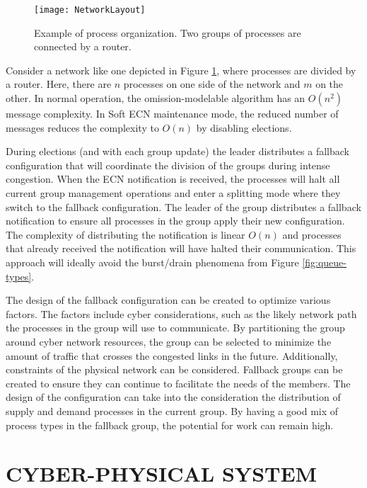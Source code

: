 \begin{figure}
\centering
\texttt{[image: NetworkLayout]}
\caption[Example of process organization.]{Example of process organization. Two groups of processes are connected by a router.} \label{fig:network-layout}
\end{figure}

Consider a network like one depicted in Figure \ref{fig:network-layout}, where processes are divided by a router.
Here, there are $n$ processes on one side of the network and $m$ on the other.
In normal operation, the omission-modelable algorithm has an $O(n^2)$ message complexity.
In Soft \ac{ECN} maintenance mode, the reduced number of messages reduces the complexity to $O(n)$ by disabling elections.

During elections (and with each group update) the leader distributes a fallback configuration that will coordinate the division of the groups during intense congestion.
When the \ac{ECN} notification is received, the processes will halt all current group management operations and enter a splitting mode where they switch to the fallback configuration.
The leader of the group distributes a fallback notification to ensure all processes in the group apply their new configuration. 
The complexity of distributing the notification is linear $O(n)$ and processes that already received the notification will have halted their communication.
This approach will ideally avoid the burst/drain phenomena from Figure \ref{fig:queue-types}.

The design of the fallback configuration can be created to optimize various factors.
The factors include cyber considerations, such as the likely network path the processes in the group will use to communicate.
By partitioning the group around cyber network resources, the group can be selected to minimize the amount of traffic that crosses the congested links in the future.
Additionally, constraints of the physical network can be considered.
Fallback groups can be created to ensure they can continue to facilitate the needs of the members.
The design of the configuration can take into the consideration the distribution of supply and demand processes in the current group.
By having a good mix of process types in the fallback group, the potential for work can remain high.

\section{CYBER-PHYSICAL SYSTEM}

